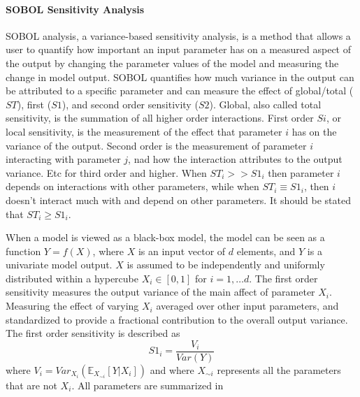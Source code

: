 \paragraph{SOBOL Sensitivity Analysis}
\label{sec:SOBOL_sensitivity_analysis}
SOBOL analysis, a variance-based sensitivity analysis, is a method that allows a user to quantify how important an input parameter has on a measured aspect of the output by changing the parameter values of the model and measuring the change in model output.
SOBOL quantifies how much variance in the output can be attributed to a specific parameter and can measure the effect of global/total ($ST$), first ($S1$), and second order sensitivity ($S2$). 
Global, also called total sensitivity, is the summation of all higher order interactions. 
First order $Si$, or local sensitivity, is the measurement of the effect that parameter $i$ has on the variance of the output. 
Second order is the measurement of parameter $i$ interacting with parameter $j$, nad how the interaction attributes to the output variance. 
Etc for third order and higher. 
When $ST_i >> S1_i$ then parameter $i$ depends on interactions with other parameters, while when $ST_i \equiv S1_i$, then $i$ doesn't interact much with and depend on other parameters.
It should be stated that $ST_i \geq S1_i$. 

When a model is viewed as a black-box model, the model can be seen as a function $Y=f(X)$, where $X$ is an input vector of $d$ elements, and $Y$ is a univariate model output.
$X$ is assumed to be independently and uniformly distributed within a hypercube $X_i \in [0, 1]$ for $i=1, \dots d$.
The first order sensitivity measures the output variance of the main affect of parameter $X_i$.
Measuring the effect of varying $X_i$ averaged over other input parameters, and standardized to provide a fractional contribution to the overall output variance.
The first order sensitivity is described as
\[
    S1_i = \frac{V_i}{\textit{Var}(Y)}
\] where $V_i = \textit{Var}_{X_i}(\mathbb{E}_{X_{\sim i}}[Y|X_i])$ and where $X_{\sim i}$ represents all the parameters that are not $X_i$.
All parameters are summarized in 

